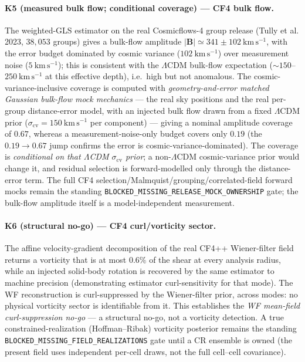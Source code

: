 \documentclass[11pt,a4paper]{article}
\theoremstyle{plain}
\theoremstyle{definition}
\begin{document}
\paragraph{K5 (measured bulk flow; conditional coverage) --- CF4 bulk flow.}
The weighted-GLS estimator on the real Cosmicflows-4 group release (Tully et al.
2023, $38{,}053$ groups) gives a bulk-flow amplitude
$|\mathbf B|\simeq341\pm102\ \mathrm{km\,s^{-1}}$, with the error budget dominated
by cosmic variance ($102\ \mathrm{km\,s^{-1}}$) over measurement noise
($5\ \mathrm{km\,s^{-1}}$); this is consistent with the $\Lambda$CDM bulk-flow
expectation ($\sim$$150$--$250\ \mathrm{km\,s^{-1}}$ at this effective depth),
i.e.\ high but not anomalous. The cosmic-variance-inclusive coverage is computed
with \emph{geometry-and-error matched Gaussian bulk-flow mock mechanics} --- the
real sky positions and the real per-group distance-error model, with an injected
bulk flow drawn from a fixed $\Lambda$CDM prior ($\sigma_{\mathrm{cv}}=150\
\mathrm{km\,s^{-1}}$ per component) --- giving a nominal amplitude coverage of
$0.67$, whereas a measurement-noise-only budget covers only $0.19$ (the
$0.19\!\to\!0.67$ jump confirms the error is cosmic-variance-dominated). The
coverage is \emph{conditional on that $\Lambda$CDM $\sigma_{\mathrm{cv}}$ prior};
a non-$\Lambda$CDM cosmic-variance prior would change it, and residual selection
is forward-modelled only through the distance-error term. The full CF4
selection/Malmquist/grouping/correlated-field forward mocks remain the standing
\texttt{BLOCKED\_MISSING\_RELEASE\_MOCK\_OWNERSHIP} gate; the bulk-flow amplitude
itself is a model-independent measurement.

\paragraph{K6 (structural no-go) --- CF4 curl/vorticity sector.}
The affine velocity-gradient decomposition of the real CF4++ Wiener-filter field
returns a vorticity that is at most $0.6\%$ of the shear at every analysis radius,
while an injected solid-body rotation is recovered by the same estimator to
machine precision (demonstrating estimator curl-sensitivity for that mode). The WF
reconstruction is curl-suppressed by the Wiener-filter prior, across modes: no
physical vorticity sector is identifiable from it. This establishes the
\emph{WF mean-field curl-suppression no-go} --- a structural no-go, not a
vorticity detection. A true constrained-realization (Hoffman--Ribak) vorticity
posterior remains the standing \texttt{BLOCKED\_MISSING\_FIELD\_REALIZATIONS}
gate until a CR ensemble is owned (the present field uses independent per-cell
draws, not the full cell--cell covariance).
\end{document}
